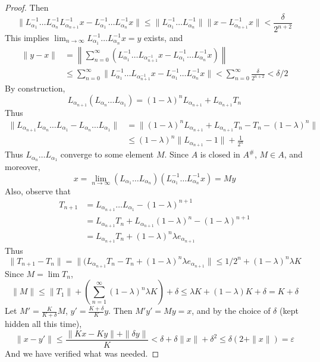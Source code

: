\begin{proof}
    Then
    \[ \| L_{\alpha_1}^{-1} \dots L_{\alpha_n}^{-1} L_{\alpha_{n+1}}^{-1} x - L_{\alpha_1}^{-1} \dots L_{\alpha_n}^{-1} x \| \leq \| L_{\alpha_1}^{-1} \dots L_{\alpha_n}^{-1} \| \| x - L_{\alpha_{n+1}}^{-1} x \| < \frac{\delta}{2^{n+2}} \]
    This implies $\lim_{n \to \infty} L_{\alpha_1}^{-1} \dots L_{\alpha_n}^{-1} x = y$ exists, and
    \begin{align*}
    \| y - x \| &= \left\| \sum_{n = 0}^\infty (L_{\alpha_1}^{-1} \dots L_{\alpha_{n+1}^{-1}} x - L_{\alpha_1}^{-1} \dots L_{\alpha_n}^{-1} x) \right\|\\
    &\leq \sum_{n = 0}^\infty \| L_{\alpha_1}^{-1} \dots L_{\alpha_{n+1}^{-1}} x - L_{\alpha_1}^{-1} \dots L_{\alpha_n}^{-1} x \| < \sum_{n = 0}^\infty \frac{\delta}{2^{n+2}} < \delta/2
    \end{align*}
    By construction,
    \[ L_{\alpha_{n+1}} (L_{\alpha_n} \dots L_{\alpha_1}) = (1 - \lambda)^n L_{\alpha_{n+1}} + L_{\alpha_{n+1}} T_n \]
    Thus
    \begin{align*}
        \| L_{\alpha_{n+1}} L_{\alpha_n} \dots L_{\alpha_1} - L_{\alpha_n} \dots L_{\alpha_1} \| &= \| (1 - \lambda)^n L_{\alpha_{n+1}} + L_{\alpha_{n+1}} T_n - T_n - (1-  \lambda)^n \|\\
        &\leq (1 - \lambda)^n \| L_{\alpha_{n+1}} - 1 \| + \frac{1}{2^n}
    \end{align*}
    Thus $L_{\alpha_n} \dots L_{\alpha_1}$ converge to some element $M$. Since $A$ is closed in $A^\#$, $M \in A$, and moreover,
    \[ x = \lim_{n \to \infty} (L_{\alpha_1} \dots L_{\alpha_n}) (L_{\alpha_1}^{-1} \dots L_{\alpha_n}^{-1} x) = My \]
    Also, observe that
    \begin{align*}
        T_{n+1} &= L_{\alpha_{n+1}} \dots L_{\alpha_1} - (1 - \lambda)^{n+1}\\
        &= L_{\alpha_{n+1}} T_n + L_{\alpha_{n+1}} (1 - \lambda)^n - (1 - \lambda)^{n+1}\\
        &= L_{\alpha_{n+1}} T_n + (1 - \lambda)^n \lambda e_{\alpha_{n+1}}
    \end{align*}
    Thus
    \[ \| T_{n+1} - T_n \| = \| (L_{\alpha_{n+1}} T_n - T_n + (1 - \lambda)^n \lambda e_{\alpha_{n+1}} \| \leq 1/2^n + (1 - \lambda)^n \lambda K \]
    Since $M = \lim T_n$,
    \[ \| M \| \leq \| T_1 \| + \left(\sum_{n = 1}^\infty (1 - \lambda)^n \lambda K \right) + \delta \leq \lambda K + (1 - \lambda) K + \delta = K + \delta \]
    Let $M' = \frac{K}{K + \delta} M$, $y' = \frac{K + \delta}{K} y$. Then $M'y' = My = x$, and by the choice of $\delta$ (kept hidden all this time),
    \[ \| x - y' \| \leq \frac{\| Kx - Ky \| + \| \delta y \|}{K} < \delta + \delta \| x \| + \delta^2 \leq \delta(2 + \|x\|) = \varepsilon \]
    And we have verified what was needed.
\end{proof}


